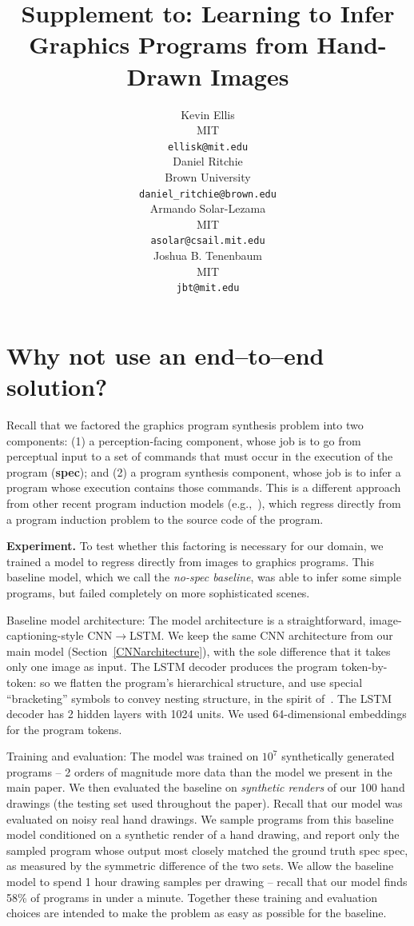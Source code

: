 \documentclass{article}
\title{Supplement to: Learning to Infer Graphics Programs from Hand-Drawn Images}
\author{
Kevin Ellis\\
  MIT\\
  \texttt{ellisk@mit.edu} \\
  \And
  Daniel Ritchie\\
Brown University\\
 \texttt{daniel\_ritchie@brown.edu} \\
 \And
 Armando Solar-Lezama\\
 MIT\\
\texttt{asolar@csail.mit.edu} \\
\And
Joshua B. Tenenbaum \\
MIT\\
\texttt{jbt@mit.edu}
}
\begin{document}

\maketitle

\section{Why not use an end--to--end solution?}

Recall that we factored the graphics program synthesis problem into two components: (1) a perception-facing component, whose job is to go from perceptual input to a set of commands that must occur in the execution of the program (\textbf{spec}); and (2) a program synthesis component, whose job is to infer a program whose execution contains those commands. This is a different approach from other recent program induction models (e.g.,~\cite{devlin2017robustfill,nps}), which regress directly from a program induction problem to the source code of the program.

\textbf{Experiment.} To test whether this factoring is necessary for our domain, we trained a model to regress directly from images to graphics programs. This baseline model, which we call the \emph{no-spec baseline}, was able to infer some simple programs, but failed completely on more sophisticated scenes.

Baseline model architecture: The model architecture is a straightforward, image-captioning-style CNN$\to$LSTM. We keep the same CNN architecture from our main model (Section~\ref{CNNarchitecture}), with the sole difference that it takes only one image as input. The LSTM decoder produces the program token-by-token: so we flatten the program's hierarchical structure, and use special ``bracketing'' symbols to convey nesting structure, in the spirit of~\citep{vinyals2015grammar}. The LSTM decoder has 2 hidden layers with 1024 units. We used 64-dimensional embeddings for the program tokens.

Training and evaluation: The model was trained on $10^7$ synthetically generated programs -- 2 orders of magnitude more data than the model we present in the main paper. We then evaluated the baseline on \emph{synthetic renders} of our 100 hand drawings (the testing set used throughout the paper). Recall that our model was evaluated on noisy real hand drawings. We sample programs from this baseline model conditioned on a synthetic render of a hand drawing, and report only the sampled program whose output most closely matched the ground truth spec spec, as measured by the symmetric difference of the two sets. We allow the baseline model to spend 1 hour drawing samples per drawing -- recall that our model finds 58\% of programs in under a minute. Together these training and evaluation choices are intended to make the problem as easy as possible for the baseline.
\end{document}

